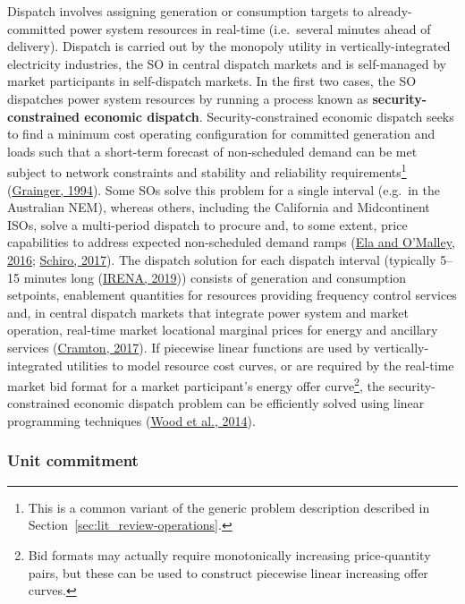 \documentclass[12pt,a4paper,]{report}
\begin{document}
Dispatch involves assigning generation or consumption targets to
already-committed power system resources in real-time (i.e.~several
minutes ahead of delivery). Dispatch is carried out by the monopoly
utility in vertically-integrated electricity industries, the SO in
central dispatch markets and is self-managed by market participants in
self-dispatch markets. In the first two cases, the SO dispatches power
system resources by running a process known as
\textbf{security-constrained economic dispatch}. Security-constrained
economic dispatch seeks to find a minimum cost operating configuration
for committed generation and loads such that a short-term forecast of
non-scheduled demand can be met subject to network constraints and
stability and reliability requirements\footnote{This is a common variant
  of the generic problem description described in
  Section~\ref{sec:lit_review-operations}.}
(\protect\hyperlink{ref-graingerPowerSystemAnalysis1994}{Grainger,
1994}). Some SOs solve this problem for a single interval (e.g.~in the
Australian NEM), whereas others, including the California and
Midcontinent ISOs, solve a multi-period dispatch to procure and, to some
extent, price capabilities to address expected non-scheduled demand
ramps (\protect\hyperlink{ref-elaSchedulingPricingExpected2016}{Ela and
O'Malley, 2016};
\protect\hyperlink{ref-schiroProcurementPricingRamping2017}{Schiro,
2017}). The dispatch solution for each dispatch interval (typically
5--15 minutes long
(\protect\hyperlink{ref-irenaIncreasingTimeGranularity2019}{IRENA,
2019})) consists of generation and consumption setpoints, enablement
quantities for resources providing frequency control services and, in
central dispatch markets that integrate power system and market
operation, real-time market locational marginal prices for energy and
ancillary services
(\protect\hyperlink{ref-cramtonElectricityMarketDesign2017}{Cramton,
2017}). If piecewise linear functions are used by vertically-integrated
utilities to model resource cost curves, or are required by the
real-time market bid format for a market participant's energy offer
curve\footnote{Bid formats may actually require monotonically increasing
  price-quantity pairs, but these can be used to construct piecewise
  linear increasing offer curves.}, the security-constrained economic
dispatch problem can be efficiently solved using linear programming
techniques
(\protect\hyperlink{ref-woodPowerGenerationOperation2014}{Wood et al.,
2014}).

\hypertarget{sec:lit_review-balancing_practices-scheduling-uc}{%
\subsubsection{Unit
commitment}\label{sec:lit_review-balancing_practices-scheduling-uc}}
\end{document}
